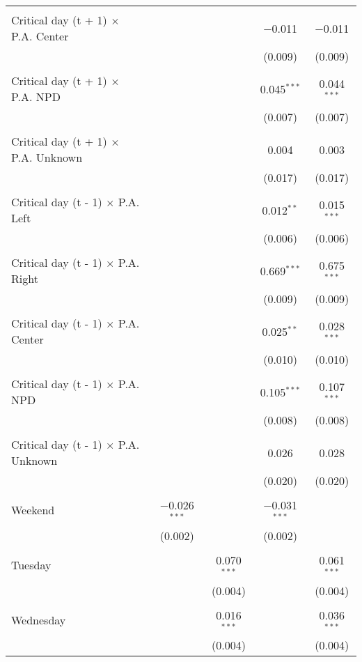 \documentclass[
]{article}
\begin{document}
\begin{table}[!htbp]
{\begin{tabular}{@{\extracolsep{5pt}}lcccc}
  & & & & \\ 
 Critical day (t + 1) $\times$ P.A. Center &  &  & $-$0.011 & $-$0.011 \\ 
  &  &  & (0.009) & (0.009) \\ 
  & & & & \\ 
 Critical day (t + 1) $\times$ P.A. NPD &  &  & 0.045$^{***}$ & 0.044$^{***}$ \\ 
  &  &  & (0.007) & (0.007) \\ 
  & & & & \\ 
 Critical day (t + 1) $\times$ P.A. Unknown &  &  & 0.004 & 0.003 \\ 
  &  &  & (0.017) & (0.017) \\ 
  & & & & \\ 
 Critical day (t - 1) $\times$ P.A. Left &  &  & 0.012$^{**}$ & 0.015$^{***}$ \\ 
  &  &  & (0.006) & (0.006) \\ 
  & & & & \\ 
 Critical day (t - 1) $\times$ P.A. Right &  &  & 0.669$^{***}$ & 0.675$^{***}$ \\ 
  &  &  & (0.009) & (0.009) \\ 
  & & & & \\ 
 Critical day (t - 1) $\times$ P.A. Center &  &  & 0.025$^{**}$ & 0.028$^{***}$ \\ 
  &  &  & (0.010) & (0.010) \\ 
  & & & & \\ 
 Critical day (t - 1) $\times$ P.A. NPD &  &  & 0.105$^{***}$ & 0.107$^{***}$ \\ 
  &  &  & (0.008) & (0.008) \\ 
  & & & & \\ 
 Critical day (t - 1) $\times$ P.A. Unknown &  &  & 0.026 & 0.028 \\ 
  &  &  & (0.020) & (0.020) \\ 
  & & & & \\ 
 Weekend & $-$0.026$^{***}$ &  & $-$0.031$^{***}$ &  \\ 
  & (0.002) &  & (0.002) &  \\ 
  & & & & \\ 
 Tuesday &  & 0.070$^{***}$ &  & 0.061$^{***}$ \\ 
  &  & (0.004) &  & (0.004) \\ 
  & & & & \\ 
 Wednesday &  & 0.016$^{***}$ &  & 0.036$^{***}$ \\ 
  &  & (0.004) &  & (0.004) \\ 

\end{tabular}}
\end{table}
\end{document}
